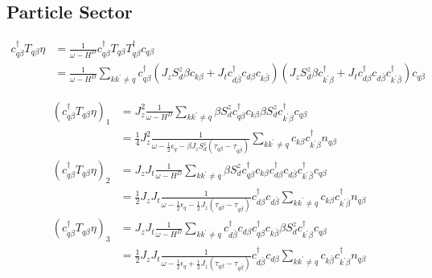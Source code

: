 \documentclass[14pt]{extarticle}
\numberwithin{equation}{section}
\begin{document}
\subsection{Particle Sector}
\begin{align}
 c^{\dag}_{q\beta}T_{q\beta}\eta &=  \frac{1}{\omega-H^D} c^{\dag}_{q\beta}T_{q\beta}  T_{q\beta}^{\dag}c_{q\beta}  \nonumber\\
&= \frac{1}{\omega - H^D} \sum\limits_{kk^{\prime}\ne q} c^{\dag}_{q\beta}\left( J_z S_d^z \beta c_{k\beta} + J_t c^{\dag}_{d\bar{\beta}} c_{d\beta} c_{k\bar{\beta}} \right) \left(  J_z S_d^z \beta c_{k^{\prime}\beta}^{\dag} + J_t c^{\dag}_{d\beta} c_{d\bar{\beta}} c^{\dag}_{k^{\prime}\bar{\beta}}  \right)  c_{q\beta}  \label{eq:24}
\end{align}

\begin{subequations} \label{eq:31} 
 \begin{align}
\left( c^{\dag}_{q\beta}T_{q\beta}\eta \right)_1  &= J_z^2 \frac{1}{\omega - H^D} \sum\limits_{kk^{\prime}\ne q} \beta S_d^z c^{\dag}_{q\beta}c_{k\beta}  \beta S_d^z c^{\dag}_{k^{\prime}\beta}c_{q\beta} \nonumber\\
                                    &= \frac{1}{4} J_z^2 \frac{1}{\omega - \frac{1}{2} \epsilon_q - \beta J_zS_d^z \left( \tau_{q\beta} - \tau_{q\bar{\beta}} \right)}  \sum\limits_{kk^{\prime}\ne q} c_{k\beta}c^{\dag}_{k^{\prime}\beta} n_{q\beta} \label{eq:32} \\
   \left( c^{\dag}_{q\beta}T_{q\beta}\eta \right)_2  &= J_z J_t\frac{1}{\omega - H^D}  \sum\limits_{kk^{\prime}\ne q} \beta S_d^z c^{\dag}_{q\beta}c_{k\beta} c^{\dag}_{d\beta} c_{d\bar{\beta}} c^{\dag}_{k^{\prime}\bar{\beta}}c_{q\beta} \nonumber\\
                                    &= \frac{1}{2} J_z J_t\frac{1}{\omega - \frac{1}{2}\epsilon_q - \frac{1}{2}J_z \left( \tau_{q\beta} - \tau_{q\bar{\beta}} \right)}  c^{\dag}_{d\beta} c_{d\bar{\beta}} \sum\limits_{kk^{\prime}\ne q}  c_{k\beta} c^{\dag}_{k^{\prime}\bar{\beta}}n_{q\beta}  \label{eq:33} \\
   \left( c^{\dag}_{q\beta}T_{q\beta}\eta \right)_3  &= J_z J_t \frac{1}{\omega - H^D} \sum\limits_{kk^{\prime}\ne q} c^{\dag}_{d\bar{\beta}} c_{d\beta} c^{\dag}_{q\beta}c_{k\bar{\beta}}  \beta S_d^z c^{\dag}_{k^{\prime}\beta}c_{q\beta} \nonumber\\
                                    &= \frac{1}{2} J_z J_t\frac{1}{\omega - \frac{1}{2}\epsilon_q + \frac{1}{2}J_z \left( \tau_{q\beta} - \tau_{q\bar{\beta}} \right)} c^{\dag}_{d\bar{\beta}} c_{d\beta} \sum\limits_{kk^{\prime}\ne q}  c_{k\bar{\beta}}  c^{\dag}_{k^{\prime}\beta} n_{q\beta} \label{eq:34} \\

\end{align}
\end{subequations}
\end{document}
